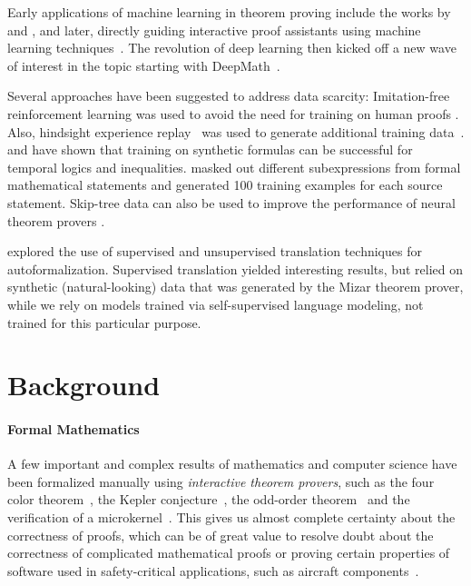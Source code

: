 \documentclass{article}
\begin{document}
Early applications of machine learning in theorem proving include the works by~\citet{Schulz2001learningsearchcontrol} and \citet{urban2004mptp}, and later, directly guiding interactive proof assistants using machine learning techniques~\citep{GauthierKUKN21TacTicToe}.
The revolution of deep learning then kicked off a new wave of interest in the topic starting with DeepMath~\citep{alemi2016deepmath, loos2017deepmath}.




Several approaches have been suggested to address data scarcity:
Imitation-free reinforcement learning was used to avoid the need for training on human proofs \citep{lederman2020qbf,bansal2019withoutimitation,GauthierKUKN21TacTicToe,wu2021tacticzero}. Also, hindsight experience replay~\citep{AndrychowiczWRS17HER} was used to generate additional training data~\citep{aygun2021hindsight}.
\citet{Hahn2021temporallogics,Schmitt2021CircuitSynthesis,kreber2021logicGANs} and \citet{WuJBG2021INT} have shown that training on synthetic formulas can be successful for temporal logics and inequalities.
\citet{rabe2021skiptree} masked out different subexpressions from formal mathematical statements and generated 100 training examples for each source statement.
Skip-tree data can also be used to improve the performance of neural theorem provers \citep{han2022pact}.

\citet{wang2018firsttranslationinformaltoformal} explored the use of supervised and unsupervised translation techniques for autoformalization.
Supervised translation yielded interesting results, but relied on synthetic (natural-looking) data that was generated by the Mizar theorem prover, while we rely on models trained via self-supervised language modeling, not trained for this particular purpose.






 \section{Background}

\paragraph{Formal Mathematics}
A few important and complex results of mathematics and computer science have been formalized manually using \emph{interactive theorem provers}, such as the four color theorem~\citep{gonthier2008formal}, the Kepler conjecture~\citep{hales2017formal}, the odd-order theorem~\citep{gonthier2013odd} and the verification of a microkernel~\citep{Klein2009seL4}.
This gives us almost complete certainty about the correctness of proofs, which can be of great value to resolve doubt about the correctness of complicated mathematical proofs or proving certain properties of software used in safety-critical applications, such as aircraft components~\citep{klein2018acm}.
\end{document}

